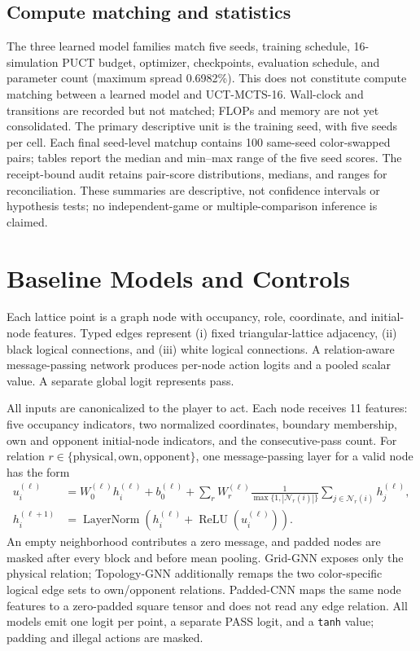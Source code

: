 \documentclass[10pt,letterpaper]{article}
\begin{document}
\subsection{Compute matching and statistics}

The three learned model families match five seeds, training schedule,
16-simulation PUCT budget, optimizer, checkpoints, evaluation schedule, and
parameter count (maximum spread 0.6982\%). This does not constitute compute
matching between a learned model and UCT-MCTS-16. Wall-clock and transitions
are recorded but not matched; FLOPs and memory are not yet consolidated. The
primary descriptive unit is the training seed, with five seeds per cell. Each
final seed-level matchup contains 100 same-seed color-swapped pairs; tables
report the median and min--max range of the five seed scores. The receipt-bound
audit retains pair-score distributions, medians, and ranges for reconciliation.
These summaries are descriptive, not confidence intervals or hypothesis tests;
no independent-game or multiple-comparison inference is claimed.

\section{Baseline Models and Controls}
\label{sec:model}

Each lattice point is a graph node with occupancy, role, coordinate, and
initial-node features. Typed edges represent (i) fixed triangular-lattice
adjacency, (ii) black logical connections, and (iii) white logical connections.
A relation-aware message-passing network produces per-node action logits and a
pooled scalar value. A separate global logit represents pass.

All inputs are canonicalized to the player to act. Each node receives 11
features: five occupancy indicators, two normalized coordinates, boundary
membership, own and opponent initial-node indicators, and the consecutive-pass
count. For relation $r\in\{\mathrm{physical},\mathrm{own},\mathrm{opponent}\}$,
one message-passing layer for a valid node has the form
\begin{equation}
  \begin{aligned}
    u_i^{(\ell)}
    &= W_0^{(\ell)} h_i^{(\ell)} + b_0^{(\ell)}
       + \sum_r W_r^{(\ell)}
         \frac{1}{\max\{1,|\mathcal{N}_r(i)|\}}
         \sum_{j\in\mathcal{N}_r(i)} h_j^{(\ell)}, \\
    h_i^{(\ell+1)}
    &= \operatorname{LayerNorm}\!\left(
         h_i^{(\ell)} + \operatorname{ReLU}(u_i^{(\ell)})
       \right).
  \end{aligned}
\end{equation}
An empty neighborhood contributes a zero message, and padded nodes are masked
after every block and before mean pooling. Grid-GNN
exposes only the physical relation; Topology-GNN additionally remaps the two
color-specific logical edge sets to own/opponent relations. Padded-CNN maps the
same node features to a zero-padded square tensor and does not read any edge
relation. All models emit one logit per point, a separate PASS logit, and a
\texttt{tanh} value; padding and illegal actions are masked.
\end{document}
